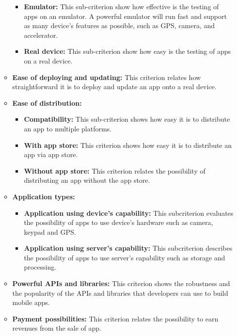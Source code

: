 \begin{itemize}
\begin{itemize}
                        \begin{itemize}
                            \item\textbf{Emulator:} This sub-criterion show how effective is the testing of apps on an emulator. A powerful emulator will run fast and support as many device’s features as possible, such as GPS, camera, and accelerator.
                            \item\textbf{Real device:} This sub-criterion show how easy is the testing of apps on a real device.
                        \end{itemize}
                        
                        \item\textbf{ Ease of deploying and updating:} This criterion relates how straightforward it is to deploy and update an app onto a real device.
                        \item\textbf{Ease of distribution:}
                        \begin{itemize}
                            \item\textbf{Compatibility:} This sub-criterion shows how easy it is to distribute an app to multiple platforms.
                             \item\textbf{ With app store:} This criterion shows how easy it is to distribute an app via app store.
                              \item\textbf{Without app store:} This criterion relates the possibility of distributing an app without the app store.
                        \end{itemize}
                        
                        \item\textbf{Application types:}
                        \begin{itemize}
                            \item\textbf{Application using device’s capability:} This subcriterion evaluates the possibility of apps to use device’s hardware such as camera, keypad and GPS.
                            \item\textbf{Application using server’s capability:} This subcriterion describes the possibility of apps to use server’s capability such as storage and processing.
                        \end{itemize}
                        
                        \item\textbf{Powerful APIs and libraries:} This criterion shows the robustness and the popularity of the APIs and libraries that developers can use to build mobile apps.
                        \item\textbf{Payment possibilities:} This criterion relates the possibility to earn revenues from the sale of app.
                \end{itemize}
                

\end{itemize}
